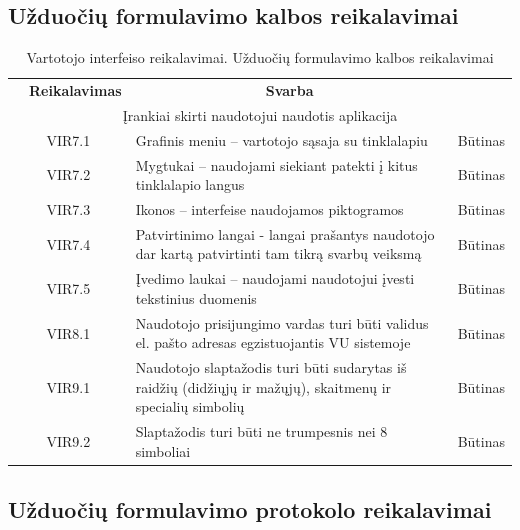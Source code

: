 \documentclass{VUMIFPSkursinis}
\begin{document}
\subsection{Užduočių formulavimo kalbos reikalavimai}
\begin{table}[H]
	\caption{Vartotojo interfeiso reikalavimai. Užduočių formulavimo kalbos reikalavimai}
\begin{tabular}{|p{1cm}|p{1cm}|p{}|p{}|}
	\hline
\rowcolor{lightgray}
\multicolumn{4}{|c|}{3. Užduočių formulavimo kalbos reikalavimai}\\		
	\hline 
\rowcolor{gray!50}
\multicolumn{2}{|c|}{{\bfseries Kodas}}&\multicolumn{1}{c|}{{\bfseries Reikalavimas}}&\multicolumn{1}{c|}{{\bfseries Svarba}}\\
\hline
\multicolumn{4}{|c|}{Įrankiai skirti naudotojui naudotis aplikacija}\\	\hline
\multicolumn{2}{|c|}{VIR7.1}&{Grafinis meniu – vartotojo sąsaja su tinklalapiu}&\multicolumn{1}{c|}{Būtinas}\\
\hline
\multicolumn{2}{|c|}{VIR7.2}&{Mygtukai – naudojami siekiant patekti į kitus tinklalapio langus}&\multicolumn{1}{c|}{Būtinas}\\
\hline
\multicolumn{2}{|c|}{VIR7.3}&{Ikonos – interfeise naudojamos piktogramos}&\multicolumn{1}{c|}{Būtinas}\\
\hline
\multicolumn{2}{|c|}{VIR7.4}&{Patvirtinimo langai - langai prašantys naudotojo dar kartą patvirtinti tam tikrą svarbų veiksmą}&\multicolumn{1}{c|}{Būtinas}\\
\hline
\multicolumn{2}{|c|}{VIR7.5}&{Įvedimo laukai – naudojami naudotojui įvesti tekstinius duomenis}&\multicolumn{1}{c|}{Būtinas}\\
\hline
\multicolumn{2}{|c|}{VIR8.1}&{Naudotojo prisijungimo vardas turi būti validus el. pašto adresas egzistuojantis VU sistemoje}&\multicolumn{1}{c|}{Būtinas}\\
\hline
\multicolumn{2}{|c|}{VIR9.1}&{Naudotojo slaptažodis turi būti sudarytas iš raidžių (didžiųjų ir mažųjų), skaitmenų ir specialių simbolių}&\multicolumn{1}{c|}{Būtinas}\\
\hline
\multicolumn{2}{|c|}{VIR9.2}&{Slaptažodis turi būti ne trumpesnis nei 8 simboliai}&\multicolumn{1}{c|}{Būtinas}\\
\hline
\end{tabular}		
\end{table}

 \subsection{Užduočių formulavimo protokolo reikalavimai}
 
\end{document}
